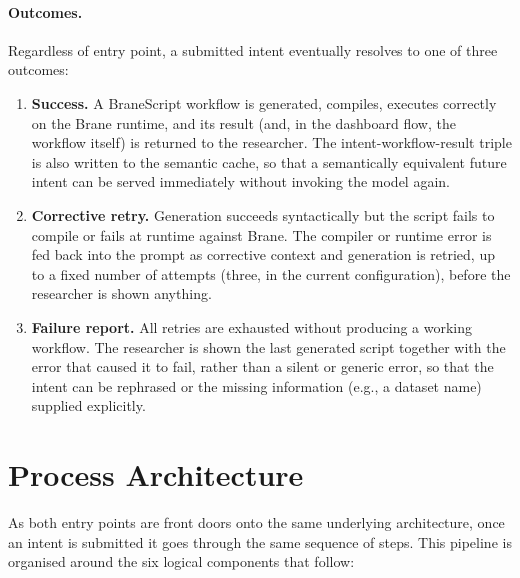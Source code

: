 \paragraph{Outcomes.} Regardless of entry point, a submitted intent
eventually resolves to one of three outcomes:

\begin{enumerate}
    \item \textbf{Success.} A BraneScript workflow is generated, compiles,
        executes correctly on the Brane runtime, and its result (and, in the
        dashboard flow, the workflow itself) is returned to the researcher.
        The intent-workflow-result triple is also written to the
        semantic cache, so that a semantically equivalent future intent can
        be served immediately without invoking the model again.
    \item \textbf{Corrective retry.} Generation succeeds syntactically but the
        script fails to compile or fails at runtime against Brane. The
        compiler or runtime error is fed back into the prompt as corrective
        context and generation is retried, up to a fixed number of attempts
        (three, in the current configuration), before the researcher is shown
        anything.
    \item \textbf{Failure report.} All retries are exhausted without producing
        a working workflow. The researcher is shown the last generated
        script together with the error that caused it to fail, rather than a
        silent or generic error, so that the intent can be rephrased or the
        missing information (e.g., a dataset name) supplied explicitly.
\end{enumerate}


\section{Process Architecture}\label{s:pipeline-variants}

As both entry points are front doors onto the same underlying architecture, once
an intent is submitted it goes through the same sequence of steps. This pipeline is
organised around the six logical components that follow:


